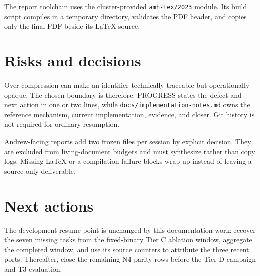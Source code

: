 \documentclass[11pt]{article}
\begin{document}
The report toolchain uses the cluster-provided \texttt{amh-tex/2023} module.
Its build script compiles in a temporary directory, validates the PDF header,
and copies only the final PDF beside its LaTeX source.

\section{Risks and decisions}
Over-compression can make an identifier technically traceable but operationally
opaque. The chosen boundary is therefore: PROGRESS states the defect and next
action in one or two lines, while \texttt{docs/implementation-notes.md} owns the
reference mechanism, current implementation, evidence, and closer. Git history
is not required for ordinary resumption.

Andrew-facing reports add two frozen files per session by explicit decision.
They are excluded from living-document budgets and must synthesize rather than
copy logs. Missing LaTeX or a compilation failure blocks wrap-up instead of
leaving a source-only deliverable.

\section{Next actions}
The development resume point is unchanged by this documentation work: recover
the seven missing tasks from the fixed-binary Tier C ablation window, aggregate
the completed window, and use its source counters to attribute the three recent
ports. Thereafter, close the remaining N4 parity rows before the Tier D campaign
and T3 evaluation.
\end{document}
